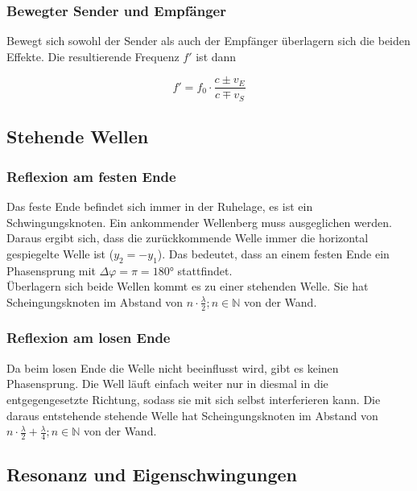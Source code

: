 \documentclass[a4paper]{article}
\begin{document}
			\subsubsection{Bewegter Sender und Empfänger}
				Bewegt sich sowohl der Sender als auch der Empfänger überlagern sich die beiden Effekte. Die resultierende Frequenz $f'$ ist dann
				
				\begin{equation}
					f' = f_0\cdot\frac{c \pm v_E}{c \mp v_S}
				\end{equation}
			
		
		\subsection{Stehende Wellen}
		
			\subsubsection{Reflexion am festen Ende}
				Das feste Ende befindet sich immer in der Ruhelage, es ist ein Schwingungsknoten. Ein ankommender Wellenberg muss ausgeglichen werden. Daraus ergibt sich, dass die zurückkommende Welle immer die horizontal gespiegelte Welle ist ($y_2 = -y_1$). Das bedeutet, dass an einem festen Ende ein Phasensprung mit $\Delta\varphi=\pi=180\si{\degree}$ stattfindet.\\
				Überlagern sich beide Wellen kommt es zu einer stehenden Welle. Sie hat Scheingungsknoten im Abstand von $n\cdot \frac{\lambda}{2}; n\in\mathbb{N}$ von der Wand.
			
			\subsubsection{Reflexion am losen Ende}
			    Da beim losen Ende die Welle nicht beeinflusst wird, gibt es keinen Phasensprung. Die Well läuft einfach weiter nur in diesmal in die entgegengesetzte Richtung, sodass sie mit sich selbst interferieren kann. Die daraus entstehende stehende Welle hat Scheingungsknoten im Abstand von $n\cdot \frac{\lambda}{2} + \frac{\lambda}{4}; n\in\mathbb{N}$ von der Wand.
			
				
		
		\subsection{Resonanz und Eigenschwingungen}%
	
\end{document}
